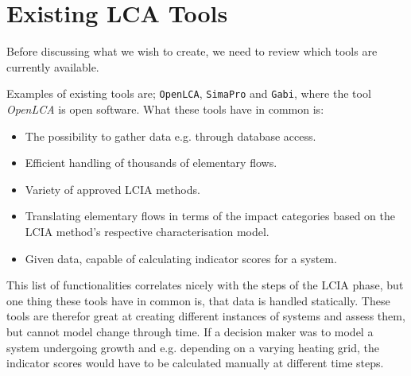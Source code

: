 \section{Existing LCA Tools}\label{sec:ExistingSoftware}


Before discussing what we wish to create,  we need to review which tools are currently available. 

Examples of existing tools are; \texttt{OpenLCA}\cite{OpenLCA}, \texttt{SimaPro}\cite{SimaPro} and \texttt{Gabi}\cite{GaBi}, where the tool \textit{OpenLCA} is open software. What these tools have in common is: 
\begin{itemize}
    \item The possibility to gather data e.g. through database access.
    \item Efficient handling of thousands of elementary flows.
    \item Variety of approved LCIA methods.
    \item Translating elementary flows in terms of the impact categories based on the LCIA method's respective characterisation model.
    \item Given data, capable of calculating indicator scores for a system.
\end{itemize}

This list of functionalities correlates nicely with the steps of the LCIA phase, but one thing these tools have in common is, that data is handled statically. These tools are therefor great at creating different instances of systems and assess them, but cannot model change through time. If a decision maker was to model a system undergoing growth and e.g. depending on a varying heating grid, the indicator scores would have to be calculated manually at different time steps. 